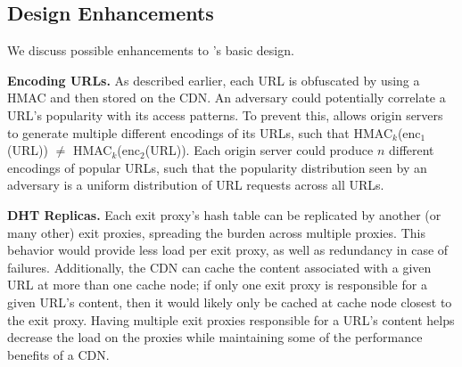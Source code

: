 
\subsection{Design Enhancements}

We discuss possible enhancements to \system{}'s basic design.


\textbf{Encoding URLs.}
As described earlier, each URL is obfuscated by using a HMAC and then stored on the CDN.  An adversary 
could potentially correlate a URL's popularity with its access patterns.  To prevent this, \system{} allows 
origin servers to generate multiple different encodings of its URLs, such that HMAC$_k$(enc$_1$(URL)) $\neq$ 
HMAC$_k$(enc$_2$(URL)).  Each origin server could produce $n$ different encodings of popular URLs, such that 
the popularity distribution seen by an adversary is a uniform distribution of URL requests across all URLs.  

\textbf{DHT Replicas.}
Each exit proxy's hash table can be replicated by another (or many other) exit proxies, spreading the burden across multiple proxies. This behavior would provide less load per exit proxy, as well as redundancy in case of failures.  Additionally, 
the CDN can cache the content associated with a given URL at more than one cache
node;
if only one exit proxy is responsible for a given URL's content, then it would likely only be cached at 
cache node closest to the exit proxy.  Having multiple exit proxies responsible for a URL's content 
helps decrease the load on the proxies while maintaining some of the performance benefits of a CDN.

